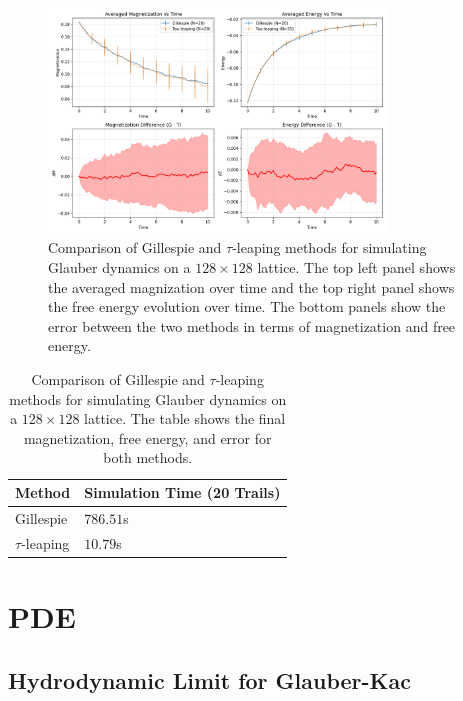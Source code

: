 \documentclass[11pt,a4paper]{article}
\begin{document}
\begin{figure}
    \centering
    \includegraphics[width=0.8\textwidth]{fig/ising_L128_ell8.0_sigma1.0_tau1.0_m00.2_beta1.0_eps0.02_compare_N20.png}
    \caption{Comparison of Gillespie and $\tau$-leaping methods for simulating Glauber dynamics on a $128 \times 128$ lattice. The top left panel shows the averaged magnization over time and the top right panel shows the free energy evolution over time. The bottom panels show the error between the two methods in terms of magnetization and free energy.}
    \label{fig:gillespie_vs_tau_leaping}
\end{figure}

\begin{table}
    \centering
    \begin{tabular}{ll}
        \hline
        \hline
        Method & Simulation Time (20 Trails) \\
        \hline
        Gillespie & $786.51$s \\
        $\tau$-leaping & $10.79$s \\
        \hline
        \hline
    \end{tabular}
    \caption{Comparison of Gillespie and $\tau$-leaping methods for simulating Glauber dynamics on a $128 \times 128$ lattice. The table shows the final magnetization, free energy, and error for both methods.}
    \label{tab:gillespie_vs_tau_leaping}
\end{table}

\section{PDE}

\subsection{Hydrodynamic Limit for Glauber-Kac}
\end{document}
